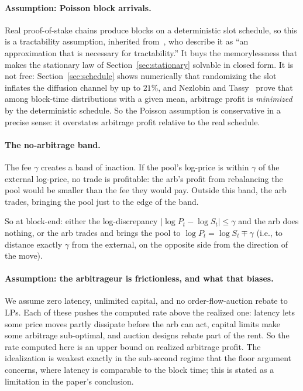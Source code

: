 \documentclass[11pt]{article}
\theoremstyle{definition}
\theoremstyle{remark}
\newcommand{\1}{\mathbf{1}}
\begin{document}
\paragraph{Assumption: Poisson block arrivals.}
Real proof-of-stake chains produce blocks on a deterministic slot schedule, so this is a tractability assumption, inherited from~\cite{milionis2023automated}, who describe it as ``an approximation that is necessary for tractability.'' It buys the memorylessness that makes the stationary law of Section~\ref{sec:stationary} solvable in closed form. It is not free: Section~\ref{sec:schedule} shows numerically that randomizing the slot inflates the diffusion channel by up to $21\%$, and Nezlobin and Tassy~\cite{nezlobin2025lvr} prove that among block-time distributions with a given mean, arbitrage profit is \emph{minimized} by the deterministic schedule. So the Poisson assumption is conservative in a precise sense: it overstates arbitrage profit relative to the real schedule.

\paragraph{The no-arbitrage band.}
The fee $\gamma$ creates a band of inaction. If the pool's log-price is within $\gamma$ of the external log-price, no trade is profitable: the arb's profit from rebalancing the pool would be smaller than the fee they would pay. Outside this band, the arb trades, bringing the pool just to the edge of the band.

So at block-end: either the log-discrepancy $|\log P_t - \log S_t| \le \gamma$ and the arb does nothing, or the arb trades and brings the pool to $\log P_t = \log S_t \mp \gamma$ (i.e., to distance exactly $\gamma$ from the external, on the opposite side from the direction of the move).

\paragraph{Assumption: the arbitrageur is frictionless, and what that biases.}
We assume zero latency, unlimited capital, and no order-flow-auction rebate to LPs. Each of these pushes the computed rate above the realized one: latency lets some price moves partly dissipate before the arb can act, capital limits make some arbitrage sub-optimal, and auction designs rebate part of the rent. So the rate computed here is an upper bound on realized arbitrage profit. The idealization is weakest exactly in the sub-second regime that the floor argument concerns, where latency is comparable to the block time; this is stated as a limitation in the paper's conclusion.
\end{document}
